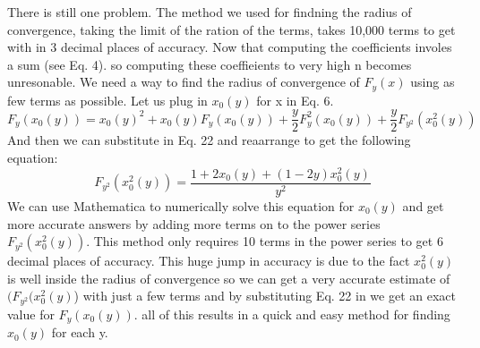 \documentclass{article}
\begin{document}
There is still one problem. The method we used for findning the radius of convergence, taking the limit of the ration of the terms, takes 10,000 terms to get with in 3 decimal places of accuracy. Now that computing the coefficients involes a sum (see Eq. 4). so computing these coeffieients to very high n becomes unresonable. We need a way to find the radius of convergence of \(F_y(x)\) using as few terms as possible. Let us plug in \(x_0(y)\) for x in Eq. 6.
\[F_y(x_0(y))=x_0(y)^2+x_0(y)F_y(x_0(y))+\frac{y}{2}F_y^2(x_0(y))+\frac{y}{2}F_{y^2}(x_0^2(y))\]
And then we can substitute in Eq. 22 and reaarrange to get the following equation:
\begin{equation}
F_{y^2}(x_0^2(y))=\frac{1+2x_0(y)+(1-2y)x_0^2(y)}{y^2}
\end{equation}
We can use Mathematica to numerically solve this equation for \(x_0(y)\) and get more accurate answers by adding more terms on to the power series \(F_{y^2}(x_0^2(y))\). This method only requires 10 terms in the power series to get 6 decimal places of accuracy. This huge jump in accuracy is due to the fact \(x_0^2(y)\) is well inside the radius of convergence so we can get a very accurate estimate of \((F_{y^2}(x_0^2(y)\)) with just a few terms and by substituting Eq. 22 in we get an exact value for \(F_y(x_0(y))\). all of this results in a quick and easy method for finding \(x_0(y)\) for each y.
\end{document}
